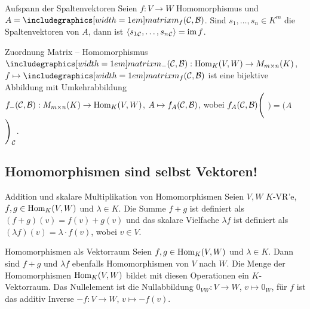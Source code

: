 \begin{Satz}{Aufspann der Spaltenvektoren}
    Seien $f: V \rightarrow W$ Homomorphismus und $A = \hommatrix{f}{C}{B}$.
    Sind $s_1, \ldots, s_n \in K^m$ die Spaltenvektoren von $A$, dann ist
    $\langle {s_1}_{\mathcal{C}}, \ldots, {s_n}_{\mathcal{C}} \rangle = \operatorname{im} f$.
\end{Satz}

\begin{Satz}{Zuordnung Matrix -- Homomorphismus}
    $\hommatrix{-}{C}{B}: \Hom_K(V, W) \rightarrow M_{m \times n}(K)$, \\
    $f \mapsto \hommatrix{f}{C}{B}$ ist eine bijektive Abbildung mit
    Umkehrabbildung \\
    $f_-(\mathcal{C}, \mathcal{B}): M_{m \times n}(K) \rightarrow \operatorname{Hom}_K(V, W)$,
    $A \mapsto f_A(\mathcal{C}, \mathcal{B})$, wobei
    $f_A(\mathcal{C}, \mathcal{B})\Bigg($%
    $\Bigg) = \Bigg(A$%
    $\Bigg)_{\mathcal{C}}$.
\end{Satz}

\subsection{%
    Homomorphismen sind selbst Vektoren!%
}

\begin{Def}{Addition und skalare Multiplikation von Homomorphismen}
    Seien $V, W$ $K$-VR'e, $f, g \in \operatorname{Hom}_K(V, W)$ und $\lambda \in K$.
    Die Summe $f + g$ ist definiert als
    $(f + g)(v) = f(v) + g(v)$ und das skalare Vielfache $\lambda f$ ist
    definiert als $(\lambda f)(v) = \lambda \cdot f(v)$,
    wobei $v \in V$.
\end{Def}

\begin{Satz}{Homomorphismen als Vektorraum}
    Seien $f, g \in \operatorname{Hom}_K(V, W)$ und $\lambda \in K$.
    Dann sind $f + g$ und $\lambda f$ ebenfalls Homomorphismen
    von $V$ nach $W$.
    Die Menge der Homomorphismen $\operatorname{Hom}_K(V, W)$ bildet mit diesen
    Operationen ein $K$-Vektorraum.
    Das Nullelement ist die Null\-abbildung
    $0_{VW}: V \rightarrow W$, $v \mapsto 0_W$, für $f$ ist das additiv Inverse
    $-f: V \rightarrow W$, $v \mapsto -f(v)$.
\end{Satz}

